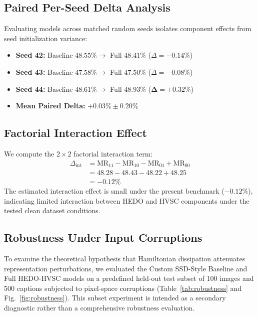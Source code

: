\documentclass[journal]{IEEEtran}
\begin{document}
\subsection{Paired Per-Seed Delta Analysis}
Evaluating models across matched random seeds isolates component effects from seed initialization variance:
\begin{itemize}
    \item \textbf{Seed 42:} Baseline $48.55\% \rightarrow$ Full $48.41\%$ ($\Delta = -0.14\%$)
    \item \textbf{Seed 43:} Baseline $47.58\% \rightarrow$ Full $47.50\%$ ($\Delta = -0.08\%$)
    \item \textbf{Seed 44:} Baseline $48.61\% \rightarrow$ Full $48.93\%$ ($\mathbf{\Delta = +0.32\%}$)
    \item \textbf{Mean Paired Delta:} $\mathbf{+0.03\% \pm 0.20\%}$
\end{itemize}

\subsection{Factorial Interaction Effect}
We compute the $2 \times 2$ factorial interaction term:
\begin{equation}
\begin{aligned}
\Delta_{\text{int}} &= \text{MR}_{11} - \text{MR}_{10} - \text{MR}_{01} + \text{MR}_{00} \\
&= 48.28 - 48.43 - 48.22 + 48.25 \\
&= -0.12\%
\end{aligned}
\end{equation}
The estimated interaction effect is small under the present benchmark ($-0.12\%$), indicating limited interaction between HEDO and HVSC components under the tested clean dataset conditions.

\subsection{Robustness Under Input Corruptions}
To examine the theoretical hypothesis that Hamiltonian dissipation attenuates representation perturbations, we evaluated the Custom SSD-Style Baseline and Full HEDO-HVSC models on a predefined held-out test subset of 100 images and 500 captions subjected to pixel-space corruptions (Table~\ref{tab:robustness} and Fig.~\ref{fig:robustness}). This subset experiment is intended as a secondary diagnostic rather than a comprehensive robustness evaluation.
\end{document}
